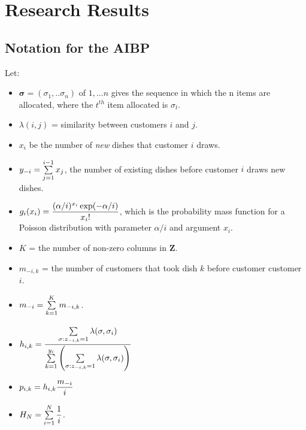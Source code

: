 \chapter{Research Results}

\section{Notation for the AIBP}
\noindent
Let:
\begin{itemize}
  \item $\bm \sigma = (\sigma_1,..\sigma_n)$ of ${1,...n}$ gives the sequence
        in which the n items are allocated, where the $t^{th}$ item allocated
        is $\sigma_t$. 
  \item $\lambda(i,j)$ = similarity between customers $i$ and $j$.
  \item $x_i$ be the number of \textit{new} dishes that customer $i$ draws.\\ 
  \item $y_{-i} = \sum\limits_{j=1}^{i-1} x_j$, the number of existing dishes
        before customer $i$ draws new dishes.
  \item $g_i(x_i) = \displaystyle\frac{(\alpha/i)^{x_i}\exp(-\alpha/i)}{x_i!}$, 
        which is the probability mass function for a Poisson distribution 
        with parameter $\alpha/i$ and argument $x_i$.\\
  \item $K$ = the number of non-zero columns in $\bm Z$.\\
  \item $m_{-i,k}$ = the number of customers that took dish $k$ before customer
        customer $i$.
  \item $m_{-i} = \sum\limits_{k=1}^{K}m_{-i,k}$.
  \item $h_{i,k} = \displaystyle\frac{\sum\limits_{\sigma:z_{-i,k}=1}^{}\lambda(\sigma,\sigma_i)}
        {\sum\limits_{k=1}^{y_i}\left(\sum\limits_{\sigma:z_{-i,k}=1}^{}\lambda(\sigma,\sigma_i)
         \right)}$
  \item $p_{i,k} = h_{i,k} \displaystyle\frac{m_{-i}}{i}$
  \item $H_N = \sum\limits_{i=1}^{N} \displaystyle\frac{1}{i}$.
\end{itemize}



